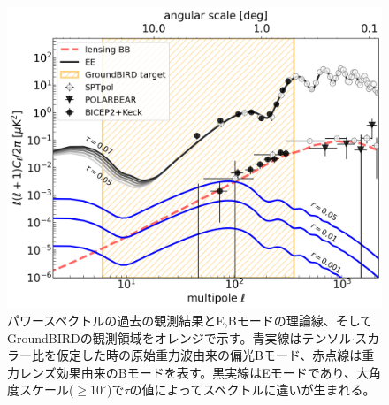 \begin{figure}[htbp]
  \centering
  \includegraphics[width=0.8\columnwidth]{3_GB/figs/cl_shonda.pdf}
  \caption{パワースペクトルの過去の観測結果とE,Bモードの理論線、そしてGroundBIRDの観測領域\cite{spie_honda}をオレンジで示す。青実線はテンソル$\cdot$スカラー比を仮定した時の原始重力波由来の偏光Bモード、赤点線は重力レンズ効果由来のBモードを表す。黒実線はEモードであり、大角度スケール($\geq 10^{\circ}$)で$\tau$の値によってスペクトルに違いが生まれる。}
  \label{cl_honda}
\end{figure}



